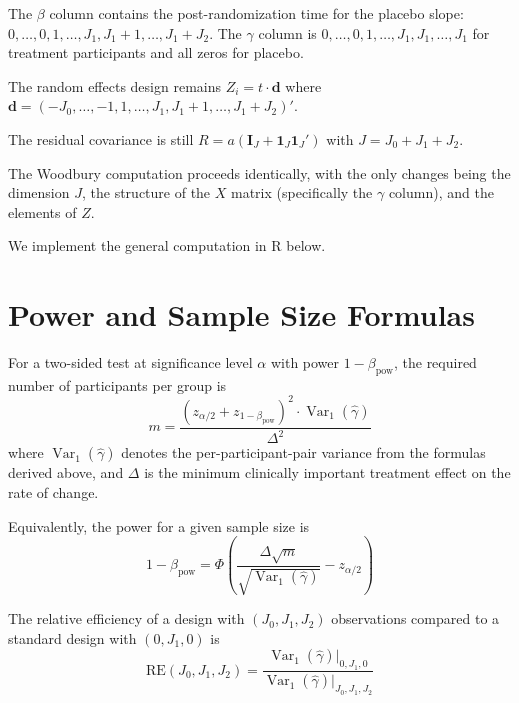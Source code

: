 \documentclass[
  11pt,
]{article}
\begin{document}
The \(\beta\) column contains the post-randomization time for
the placebo slope: \(0,\ldots,0,1,\ldots,J_1,J_1+1,\ldots,J_1+J_2\).
The \(\gamma\) column is \(0,\ldots,0,1,\ldots,J_1,J_1,\ldots,J_1\)
for treatment participants and all zeros for placebo.

The random effects design remains \(Z_i = t \cdot \mathbf{d}\)
where \(\mathbf{d} = (-J_0,\ldots,-1,1,\ldots,J_1,J_1+1,\ldots,J_1+J_2)'\).

The residual covariance is still
\(R = a(\mathbf{I}_J + \mathbf{1}_J\mathbf{1}_J')\) with
\(J = J_0 + J_1 + J_2\).

The Woodbury computation proceeds identically, with the only
changes being the dimension \(J\), the structure of the \(X\)
matrix (specifically the \(\gamma\) column), and the elements
of \(Z\).

We implement the general computation in R below.

\section{Power and Sample Size Formulas}\label{power-and-sample-size-formulas}

For a two-sided test at significance level \(\alpha\) with
power \(1-\beta_{\text{pow}}\), the required number of
participants per group is
\begin{equation}
  m = \frac{(z_{\alpha/2} + z_{1-\beta_{\text{pow}}})^2
    \cdot \mathop{\mathrm{Var}}_1(\hat{\gamma})}{\Delta^2}
  \label{eq:sample_size}
\end{equation}
where \(\mathop{\mathrm{Var}}_1(\hat{\gamma})\) denotes the per-participant-pair
variance from the formulas derived above, and \(\Delta\) is the
minimum clinically important treatment effect on the rate of
change.

Equivalently, the power for a given sample size is
\begin{equation}
  1 - \beta_{\text{pow}} = \Phi\!\left(
    \frac{\Delta\sqrt{m}}
      {\sqrt{\mathop{\mathrm{Var}}_1(\hat{\gamma})}}
    - z_{\alpha/2}
  \right)
  \label{eq:power}
\end{equation}

The relative efficiency of a design with \((J_0, J_1, J_2)\)
observations compared to a standard design with \((0, J_1, 0)\)
is
\begin{equation}
  \text{RE}(J_0, J_1, J_2)
  = \frac{\mathop{\mathrm{Var}}_1(\hat{\gamma})\big|_{0,J_1,0}}
         {\mathop{\mathrm{Var}}_1(\hat{\gamma})\big|_{J_0,J_1,J_2}}
  \label{eq:RE}
\end{equation}
\end{document}
